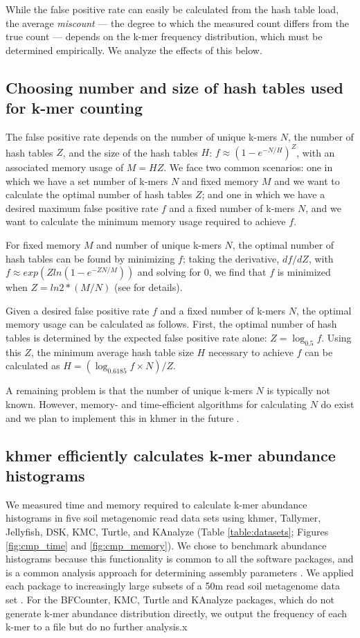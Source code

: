 \documentclass[10pt]{article}
\begin{document}
While the false positive rate can easily be calculated from the hash table
load, the average {\em miscount} --- the degree to which the measured
count differs from the true count --- depends on the k-mer frequency
distribution, which must be determined empirically.  We analyze the
effects of this below.


\subsection*{Choosing number and size of hash tables used for k-mer counting}

The false positive rate depends on the number of unique k-mers $N$,
the number of hash tables $Z$, and the size of the hash tables $H$: $f
\approx (1-e^{-N/H})^{Z}$, with an associated memory usage of $M = H
Z$.  We face two common scenarios: one in which we have a set number
of k-mers $N$ and fixed memory $M$ and we want to calculate the
optimal number of hash tables $Z$; and one in which we have a desired
maximum false positive rate $f$ and a fixed number of k-mers $N$, and
we want to calculate the minimum memory usage required to achieve $f$.

For fixed memory $M$ and number of unique k-mers $N$, the optimal
number of hash tables can be found by minimizing $f$; taking the
derivative, $df/dZ$, with $f \approx exp(Zln(1-e^{-ZN/M}))$ and solving
for 0, we find that $f$ is minimized when $Z=ln2*(M/N)$ (see
\cite{broder2004network} for details).

Given a desired false positive rate $f$ and a fixed number of k-mers
$N$, the optimal memory usage can be calculated as follows.  First,
the optimal number of hash tables is determined by the expected false
positive rate alone: $Z = \log_{0.5}f$.  Using this $Z$, the minimum
average hash table size $H$ necessary to achieve $f$ can be calculated
as $H = (\log_{0.6185}f\times N)/Z$.

A remaining problem is that the number of unique k-mers $N$ is
typically not known.  However, memory- and time-efficient algorithms
for calculating $N$ do exist and we plan to implement this in
khmer in the future \cite{flajolet2008hyperloglog}.

\subsection*{khmer efficiently calculates k-mer abundance histograms}

We measured time and memory required to calculate k-mer abundance
histograms in five soil metagenomic read data sets using khmer,
Tallymer, Jellyfish, DSK, KMC, Turtle, and KAnalyze (Table
\ref{table:datasets}; Figures \ref{fig:cmp_time} and
\ref{fig:cmp_memory}).  We chose to benchmark abundance histograms
because this functionality is common to all the software packages, and
is a common analysis approach for determining assembly parameters
\cite{Chikhi:2014aa}.  We applied each package to increasingly large
subsets of a 50m read soil metagenome data set \cite{Howe2012}. For
the BFCounter, KMC, Turtle and KAnalyze packages, which do not
generate k-mer abundance distribution directly, we output the
frequency of each k-mer to a file but do no further analysis.x
\end{document}
